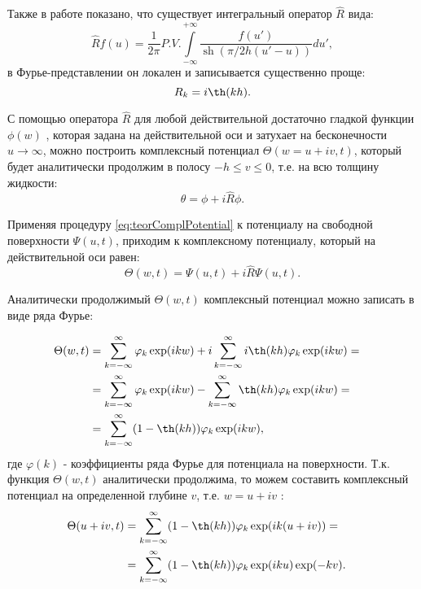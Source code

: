 Также в работе \cite{DiachZK1996} показано, что существует интегральный оператор $\hat{R}$ вида:
\begin{equation}\label{eq:intR}
\hat{R}f(u)=\frac{1}{2\pi}P.V.\int\limits_{-\infty}^{+\infty}\frac{f(u')}{\operatorname{sh}(\pi/2h(u'-u))}du',
\end{equation}
в Фурье-представлении он локален и записывается существенно проще:
\begin{equation}\label{eq:intR_fourie}
R_k=i\th(kh).
\end{equation}

С помощью оператора $\hat{R}$  для любой действительной достаточно гладкой функции $\phi(w)$ , которая задана на действительной оси и затухает на бесконечности $u\rightarrow\infty$, можно построить комплексный потенциал $\Theta(w=u+iv,t)$, который будет аналитически продолжим в полосу $-h\leq v\leq0$, т.е. на всю толщину жидкости:
\begin{equation}\label{eq:teorComplPotential}
\theta=\phi+i\hat{R}\phi.
\end{equation}

Применяя процедуру \eqref{eq:teorComplPotential} к потенциалу на свободной поверхности  $\Psi(u,t)$, приходим к комплексному потенциалу, который на действительной оси равен:
\begin{equation}\label{eq:myComplPotential}
\Theta(w,t)=\Psi(u,t)+i\hat{R}\Psi(u,t).
\end{equation}

Аналитически продолжимый $\Theta(w,t)$ комплексный потенциал можно записать в виде ряда Фурье:

\begin{align}\label{eq:MainResult}
\Theta(w,t) &= \sum\limits_{k=-\infty}^{\infty}\varphi_k\exp(ikw)+i\sum\limits_{k=-\infty}^{\infty}i\th(kh)\varphi_k\exp(ikw)=&\notag\\
&=\sum\limits_{k=-\infty}^{\infty}\varphi_k\exp(ikw)-\sum\limits_{k=-\infty}^{\infty}\th(kh)\varphi_k\exp(ikw)=&\notag\\
&=\sum\limits_{k=-\infty}^{\infty}(1-\th(kh))\varphi_k\exp(ikw),&
\end{align}
где  $\varphi(k)$ - коэффициенты ряда Фурье для потенциала на поверхности.
Т.к.  функция $\Theta(w,t)$  аналитически продолжима, то можем составить комплексный потенциал на определенной глубине $v$, т.е. $w=u+iv$ :
\begin{align}\label{eq:MainResult_1}
\Theta(u+iv,t) &= \sum\limits_{k=-\infty}^{\infty}(1-\th(kh))\varphi_k\exp(ik(u+iv))=&\notag\\
&=\sum\limits_{k=-\infty}^{\infty}(1-\th(kh))\varphi_k\exp(iku)\exp(-kv).&
\end{align}

